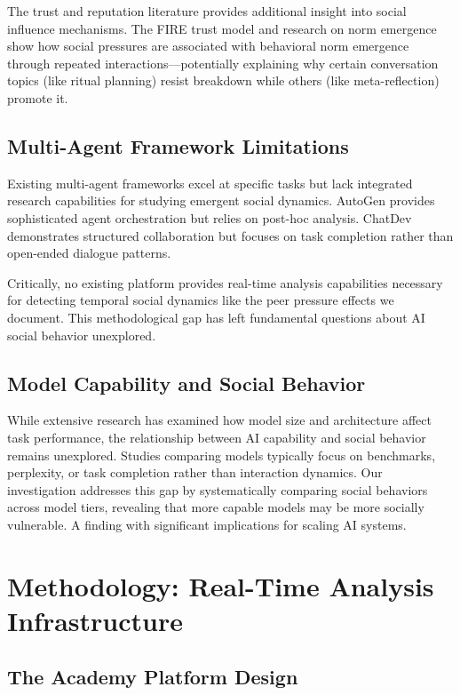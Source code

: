 \documentclass[11pt,letterpaper]{article}
\begin{document}
The trust and reputation literature provides additional insight into social influence mechanisms. The FIRE trust model \citep{huynh2006fire} and research on norm emergence \citep{morales2015synthesizing} show how social pressures are associated with behavioral norm emergence through repeated interactions—potentially explaining why certain conversation topics (like ritual planning) resist breakdown while others (like meta-reflection) promote it.

\subsection{Multi-Agent Framework Limitations}

Existing multi-agent frameworks excel at specific tasks but lack integrated research capabilities for studying emergent social dynamics. AutoGen \citep{wu2023autogen} provides sophisticated agent orchestration but relies on post-hoc analysis. ChatDev \citep{qian2023chatdev} demonstrates structured collaboration but focuses on task completion rather than open-ended dialogue patterns.

Critically, no existing platform provides real-time analysis capabilities necessary for detecting temporal social dynamics like the peer pressure effects we document. This methodological gap has left fundamental questions about AI social behavior unexplored.

\subsection{Model Capability and Social Behavior}

While extensive research has examined how model size and architecture affect task performance, the relationship between AI capability and social behavior remains unexplored. Studies comparing models typically focus on benchmarks, perplexity, or task completion rather than interaction dynamics. Our investigation addresses this gap by systematically comparing social behaviors across model tiers, revealing that more capable models may be more socially vulnerable. A finding with significant implications for scaling AI systems.

\section{Methodology: Real-Time Analysis Infrastructure}

\subsection{The Academy Platform Design}
\end{document}
